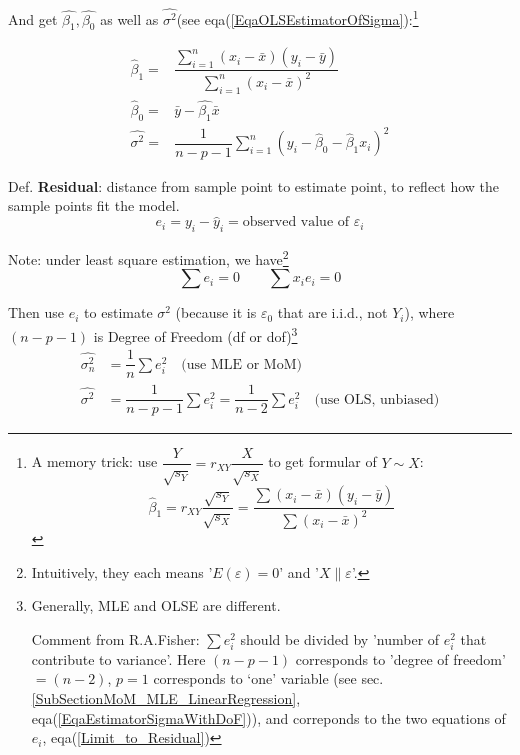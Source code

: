     
    And get $ \hat{\beta _1},\hat{\beta _0}$ as well as $ \hat{\sigma^2} $(see eqa(\ref{EqaOLSEstimatorOfSigma}):\footnote{A memory trick: use $ \dfrac{Y}{\sqrt{s_Y}}=r_{XY}\dfrac{X}{\sqrt{s_X}} $ to get formular of $ Y\sim X $:
    \begin{equation}
        \hat{\beta }_1=r_{XY}\dfrac{\sqrt{s_Y}}{\sqrt{s_X}}=\dfrac{{\displaystyle\sum (x_i-\bar{x})(y_i-\bar{y})}}{{\displaystyle\sum (x_i-\bar{x})^2}} 
    \end{equation}}

\begin{equation}\label{EqaOLSEstimatorOfBeta}
    \begin{aligned}
        \hat{\beta }_1=&\dfrac{\sum\limits_{i=1}^n (x_i-\bar{x})(y_i-\bar{y})}{\sum\limits_{i=1}^n (x_i-\bar{x})^2}\\
        \hat{\beta }_0=&\bar{y}-\hat{\beta _1}\bar{x}\\
        \hat{\sigma^2}=&\dfrac{1}{n-p-1}\sum_{i=1}^n(y_i-\hat{\beta }_0-\hat{\beta }_1x_i)^2
    \end{aligned}
\end{equation}


    
    Def. \textbf{Residual}: distance from sample point to estimate point, to reflect how the sample points fit the model.
    \begin{equation}
        e_i=y_i-\hat{y}_i=\text{observed value of }\varepsilon _i 
    \end{equation}
    
    Note: under least square estimation, we have\footnote{Intuitively, they each means '$ E(\varepsilon )=0 $' and '$ X\parallel \varepsilon  $'.}
\begin{equation}\label{Limit_to_Residual}
        \sum e_i=0\qquad \sum x_ie_i=0 
\end{equation}
    

    Then use $ e_i $ to estimate $ \sigma ^2 $ (because it is $ \varepsilon _0 $ that are i.i.d., not $ Y_i $), where $ (n-p-1) $ is Degree of Freedom (df or dof)\footnote{Generally, MLE and OLSE are different.

    Comment from R.A.Fisher: $ \sum e_i^2 $ should be divided by 'number of $ e_i^2 $ that contribute to variance'. Here $ (n-p-1) $ corresponds to 'degree of freedom' $ =(n-2) $, $ p=1 $ corresponds to `one' variable (see sec.\ref{SubSectionMoM_MLE_LinearRegression}, eqa(\ref{EqaEstimatorSigmaWithDoF})), and correponds to the two equations of $ e_i $, eqa(\ref{Limit_to_Residual})}
\begin{equation}\label{EqaOLSEstimatorOfSigma}
    \begin{aligned}
        \hat{\sigma _n^2}&=\dfrac{1}{n}\sum e_i^2 \quad\text{(use MLE or MoM)}\\
        \hat{\sigma^2}&=\dfrac{1}{n-p-1}\sum e_i^2=\dfrac{1}{n-2}\sum e_i^2\quad\text{(use OLS, unbiased)}
\end{aligned}
\end{equation}

